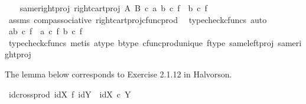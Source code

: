 \begin{isabellebody}
\ \ \isamarkupfalse%
\ same{\isacharunderscore}{\kern0pt}right{\isacharunderscore}{\kern0pt}proj{\isacharcolon}{\kern0pt}\ {\isachardoublequoteopen}right{\isacharunderscore}{\kern0pt}cart{\isacharunderscore}{\kern0pt}proj\ A\ B\ {\isasymcirc}\isactrlsub c\ {\isasymlangle}a{\isacharcomma}{\kern0pt}\ b{\isasymrangle}\ {\isasymcirc}\isactrlsub c\ f\ {\isacharequal}{\kern0pt}\ b\ {\isasymcirc}\isactrlsub c\ f{\isachardoublequoteclose}\isanewline
\ \ \ \ \isamarkupfalse%
\ assms\ comp{\isacharunderscore}{\kern0pt}associative{}\ right{\isacharunderscore}{\kern0pt}cart{\isacharunderscore}{\kern0pt}proj{\isacharunderscore}{\kern0pt}cfunc{\isacharunderscore}{\kern0pt}prod\ \isamarkupfalse%
\ {\isacharparenleft}{\kern0pt}typecheck{\isacharunderscore}{\kern0pt}cfuncs{\isacharcomma}{\kern0pt}\ auto{\isacharparenright}{\kern0pt}\isanewline
\ \ \isamarkupfalse%
\ {\isachardoublequoteopen}{\isasymlangle}a{\isacharcomma}{\kern0pt}b{\isasymrangle}\ {\isasymcirc}\isactrlsub c\ f\ {\isacharequal}{\kern0pt}\ {\isasymlangle}a\ {\isasymcirc}\isactrlsub c\ f{\isacharcomma}{\kern0pt}\ b\ {\isasymcirc}\isactrlsub c\ f{\isasymrangle}{\isachardoublequoteclose}\isanewline
\ \ \ \ \isamarkupfalse%
\ {\isacharparenleft}{\kern0pt}typecheck{\isacharunderscore}{\kern0pt}cfuncs{\isacharcomma}{\kern0pt}\ metis\ a{\isacharunderscore}{\kern0pt}type\ b{\isacharunderscore}{\kern0pt}type\ cfunc{\isacharunderscore}{\kern0pt}prod{\isacharunderscore}{\kern0pt}unique\ f{\isacharunderscore}{\kern0pt}type\ same{\isacharunderscore}{\kern0pt}left{\isacharunderscore}{\kern0pt}proj\ same{\isacharunderscore}{\kern0pt}right{\isacharunderscore}{\kern0pt}proj{\isacharparenright}{\kern0pt}\isanewline
{}\isamarkupfalse%
%
\endisatagproof
{\isafoldproof}%
%
\isadelimproof
%
\endisadelimproof
%
\begin{isamarkuptext}%
The lemma below corresponds to Exercise 2.1.12 in Halvorson.%
\end{isamarkuptext}\isamarkuptrue%
\isamarkupfalse%
\ id{\isacharunderscore}{\kern0pt}cross{\isacharunderscore}{\kern0pt}prod{\isacharcolon}{\kern0pt}\ {\isachardoublequoteopen}id{\isacharparenleft}{\kern0pt}X{\isacharparenright}{\kern0pt}\ {\isasymtimes}\isactrlsub f\ id{\isacharparenleft}{\kern0pt}Y{\isacharparenright}{\kern0pt}\ {\isacharequal}{\kern0pt}\ id{\isacharparenleft}{\kern0pt}X\ {\isasymtimes}\isactrlsub c\ Y{\isacharparenright}{\kern0pt}{\isachardoublequoteclose}\isanewline
%
\isadelimproof
\ \ %
\endisadelimproof
%
\isatagproof

\end{isabellebody}
